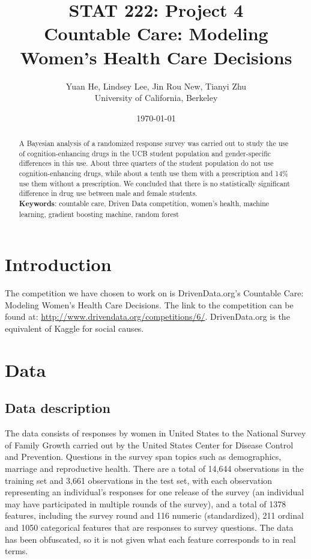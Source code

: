 \documentclass{article}\usepackage[]{graphicx}\usepackage[]{color}
\title{STAT 222: Project 4\\
       Countable Care: Modeling Women's Health Care Decisions}
\author{Yuan He, Lindsey Lee, Jin Rou New, Tianyi Zhu\\
        University of California, Berkeley}
\date{\today}
\begin{document}
\maketitle

\begin{abstract}
  A Bayesian analysis of a randomized response survey was carried out to study the use of cognition-enhancing drugs in the UCB student population and gender-specific differences in this use. About three quarters of the student population do not use cognition-enhancing drugs, while about a tenth use them with a prescription and 14\% use them without a prescription. We concluded that there is no statistically significant difference in drug use between male and female students. \\ 
	\hfill\break
	\textbf{Keywords}: countable care, Driven Data competition, women's health, machine learning, gradient boosting machine, random forest
\end{abstract}
\clearpage
\section{Introduction}
\label{sec:introduction}

The competition we have chosen to work on is DrivenData.org's Countable Care: Modeling Women's Health Care Decisions. The link to the competition can be found at: \href{http://www.drivendata.org/competitions/6/}{http://www.drivendata.org/competitions/6/}. DrivenData.org is the equivalent of Kaggle for social causes.
\section{Data}
\label{sec:data}

\subsection{Data description}
The data consists of responses by women in United States to the National Survey of Family Growth carried out by the United States Center for Disease Control and Prevention. Questions in the survey span topics such as demographics, marriage and reproductive health. There are a total of 14,644 observations in the training set and 3,661 observations in the test set, with each observation representing an individual’s responses for one release of the survey (an individual may have participated in multiple rounds of the survey), and a total of 1378 features, including the survey round and 116 numeric (standardized), 211 ordinal and 1050 categorical features that are responses to survey questions. The data has been obfuscated, so it is not given what each feature corresponds to in real terms.
\end{document}

